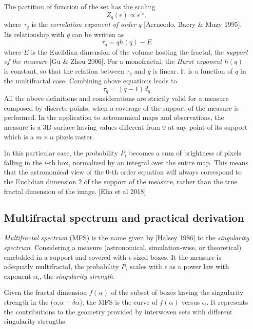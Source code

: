 The partition of function of the set has the scaling 
\begin{equation}
    Z_q(\epsilon)\propto\epsilon^{\tau_q},
\end{equation}
where $\tau_q$ is the \emph{correlation exponent of order} $q$ [Arrneodo, Bacry \& Muzy 1995]. Its relationship with $q$ can be written as
\begin{equation}
    \tau_q=qh(q)-E
\end{equation}
where $E$ is the Euclidian dimension of the volume hosting the fractal, the \emph{support of the measure} [Gu \& Zhou 2006]. For a monofractal, the \emph{Hurst exponent} $h(q)$ is constant, so that the relation between $ \tau_q$ and $q$ is linear. It is a function of $q$ in the multifractal case. 
Combining above equations leads to
\begin{equation}
    \tau_q=(q-1)d_q
\end{equation}
All the above definitions and considerations are strictly valid for a measure composed by discrete points, when a coverage of the support of the measure is performed. In the application to astronomical maps and observations, the measure is a 3D surface having values different from 0 at any point of its support which is a $m\times n$ pixels raster.

In this particular case, the probability $P_i$ becomes a sum of brightness of pixels falling in the $i$-th box, normalized by an integral over the entire map. This means that the astronomical view of the $0$-th order equation will always correspond to the Euclidian dimension $2$ of the support of the measure, rather than the true fractal dimension of the image. [Elia et al 2018]  

\subsection{Multifractal spectrum and practical derivation}
\emph{Multifractal spectrum} (MFS) is the name given by [Halsey 1986] to the \emph{singularity spectrum}. Considering a measure (astronomical, simulation-wise, or theoretical) emebdded in a support and covered with $\epsilon$-sized boxes. It the measure is adequatly multifractal, the probability $P_i$ scales with $\epsilon$ as a power law with exponent $\alpha_i$, the \emph{singularity strength}. 

Given the fractal dimension $f(\alpha)$ of the subset of boxes having the singularity strength in the ($\alpha$,$\alpha+\delta\alpha$), the MFS is the curve of $f(\alpha)$ versus $\alpha$. It represents the contributions to the geometry provided by interwoven sets with different singularity strengths. 

